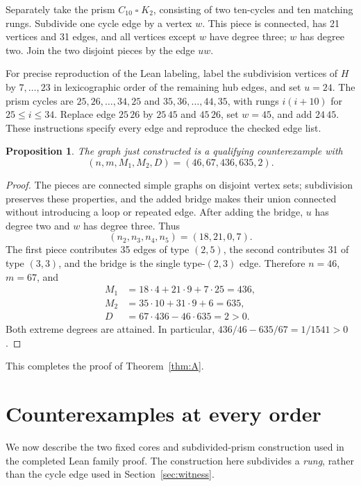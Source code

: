 \documentclass[11pt]{amsart}
\newtheorem{proposition}[theorem]{Proposition}
\theoremstyle{definition}
\theoremstyle{remark}
\begin{document}
Separately take the prism $C_{10}\mathbin{\square}K_2$, consisting of two ten-cycles and ten matching rungs. Subdivide one cycle edge by a vertex $w$. This piece is connected, has 21 vertices and 31 edges, and all vertices except $w$ have degree three; $w$ has degree two. Join the two disjoint pieces by the edge $uw$.

For precise reproduction of the Lean labeling, label the subdivision vertices of $H$ by $7,\ldots,23$ in lexicographic order of the remaining hub edges, and set $u=24$. The prism cycles are $25,26,\ldots,34,25$ and $35,36,\ldots,44,35$, with rungs $i(i+10)$ for $25\le i\le34$. Replace edge $25\,26$ by $25\,45$ and $45\,26$, set $w=45$, and add $24\,45$. These instructions specify every edge and reproduce the checked edge list.

\begin{proposition}\label{prop:witness}
The graph just constructed is a qualifying counterexample with
\[
 (n,m,M_1,M_2,D)=(46,67,436,635,2).
\]
\end{proposition}
\begin{proof}
The pieces are connected simple graphs on disjoint vertex sets; subdivision preserves these properties, and the added bridge makes their union connected without introducing a loop or repeated edge. After adding the bridge, $u$ has degree two and $w$ has degree three. Thus
\[
 (n_2,n_3,n_4,n_5)=(18,21,0,7).
\]
The first piece contributes 35 edges of type $(2,5)$, the second contributes 31 of type $(3,3)$, and the bridge is the single type-$(2,3)$ edge. Therefore $n=46$, $m=67$, and
\begin{align*}
 M_1&=18\cdot4+21\cdot9+7\cdot25=436,\\
 M_2&=35\cdot10+31\cdot9+6=635,\\
 D&=67\cdot436-46\cdot635=2>0.
\end{align*}
Both extreme degrees are attained. In particular,
$436/46-635/67=1/1541>0$.
\end{proof}
This completes the proof of Theorem~\ref{thm:A}.

\section{Counterexamples at every order}\label{sec:family}
We now describe the two fixed cores and subdivided-prism construction used in the completed Lean family proof. The construction here subdivides a \emph{rung}, rather than the cycle edge used in Section~\ref{sec:witness}.
\end{document}
